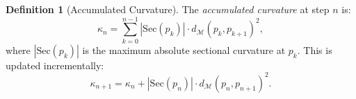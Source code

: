 \documentclass[11pt,a4paper]{article}
\theoremstyle{definition}
\newtheorem{definition}[theorem]{Definition}
\theoremstyle{remark}
\newcommand{\Sec}{\mathrm{Sec}}
\begin{document}

\begin{definition}[Accumulated Curvature]\label{def:curvature_accum}
The \emph{accumulated curvature} at step $n$ is:
\begin{equation}\label{eq:curvature_accum}
    \kappa_n = \sum_{k=0}^{n-1} |\Sec(p_k)| \cdot 
    d_{\mathcal{M}}(p_k, p_{k+1})^2,
\end{equation}
where $|\Sec(p_k)|$ is the maximum absolute sectional curvature 
at $p_k$. This is updated incrementally:
\begin{equation}\label{eq:kappa_update}
    \kappa_{n+1} = \kappa_n + |\Sec(p_n)| \cdot 
    d_{\mathcal{M}}(p_n, p_{n+1})^2.
\end{equation}
\end{definition}
\end{document}
